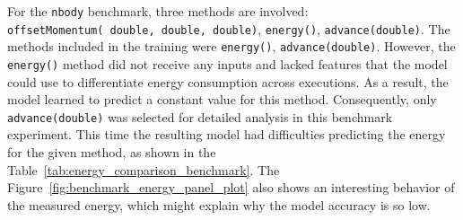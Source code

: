 For the \texttt{nbody} benchmark, three methods are involved: \texttt{offsetMomentum(\allowbreak\ double,\allowbreak\ double,\allowbreak\ double)},
\texttt{energy()}, \texttt{advance(double)}. The methods included in the training were \texttt{energy()}, \texttt{advance(double)}. However, the \texttt{energy()} method did not receive any inputs and lacked features that the model could use to differentiate energy consumption across executions. As a result, the model learned to predict a constant value for this method. Consequently, only \texttt{advance(double)} was selected for detailed analysis in this benchmark experiment.
This time the resulting model had difficulties predicting the energy for the given method, as shown in the Table~\ref{tab:energy_comparison_benchmark}. The Figure~\ref{fig:benchmark_energy_panel_plot} also shows an interesting behavior of the measured energy, which might explain why the model accuracy is so low.


\begin{table}[htbp]
  \centering
  \footnotesize
  \setlength{\tabcolsep}{10pt} 
  \caption{Comparison of actual and predicted energy consumption for nBody, fannkuch and spectralnorm program}
  \label{tab:energy_comparison_benchmark}
\end{table}


